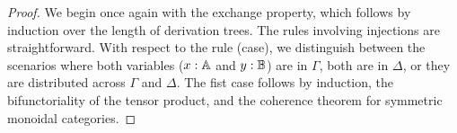\documentclass[10pt,a4paper]{amsart}
\theoremstyle{definition}
\theoremstyle{definition}
\theoremstyle{definition}
\theoremstyle{definition}
\theoremstyle{definition}
\theoremstyle{definition}
\begin{document}
\begin{proof}
  We begin once again with the exchange property, which follows by induction over the length of derivation trees. The rules involving injections are straightforward. With respect to the rule (case), we distinguish between the scenarios where both variables ($x : \mathbb{A}$ and $y : \mathbb{B}$) are in $\Gamma$, both are in $\Delta$, or they are distributed across $\Gamma$ and $\Delta$.
  The fist case follows by induction, the bifunctoriality of the tensor product, and the coherence theorem for symmetric monoidal categories.


\end{proof}
\end{document}
